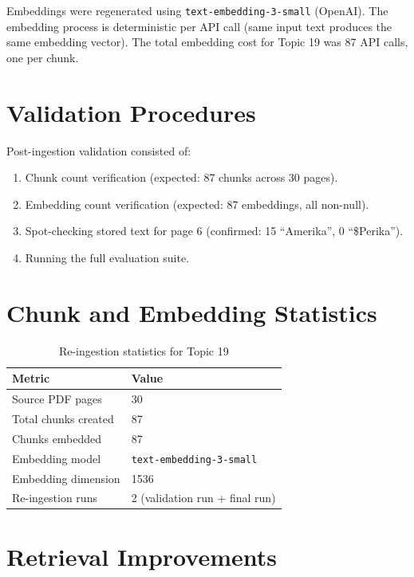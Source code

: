 \documentclass[12pt, a4paper]{report}
\newcommand{\codeinline}[1]{\texttt{#1}}
\begin{document}
Embeddings were regenerated using \codeinline{text-embedding-3-small} (OpenAI).
The embedding process is deterministic per API call (same input text produces
the same embedding vector). The total embedding cost for Topic 19 was
87 API calls, one per chunk.

\section{Validation Procedures}

Post-ingestion validation consisted of:
\begin{enumerate}[noitemsep]
  \item Chunk count verification (expected: 87 chunks across 30 pages).
  \item Embedding count verification (expected: 87 embeddings, all non-null).
  \item Spot-checking stored text for page 6 (confirmed: 15 ``Amerika'',
        0 ``\$Perika'').
  \item Running the full evaluation suite.
\end{enumerate}

\section{Chunk and Embedding Statistics}

\begin{table}[H]
  \centering
  \caption{Re-ingestion statistics for Topic 19}
  \label{tab:reingest_stats}
  \begin{tabular}{ll}
    \toprule
    \textbf{Metric}       & \textbf{Value} \\
    \midrule
    Source PDF pages      & 30 \\
    Total chunks created  & 87 \\
    Chunks embedded       & 87 \\
    Embedding model       & \texttt{text-embedding-3-small} \\
    Embedding dimension   & 1536 \\
    Re-ingestion runs     & 2 (validation run + final run) \\
    \bottomrule
  \end{tabular}
\end{table}

\section{Retrieval Improvements}
\end{document}
